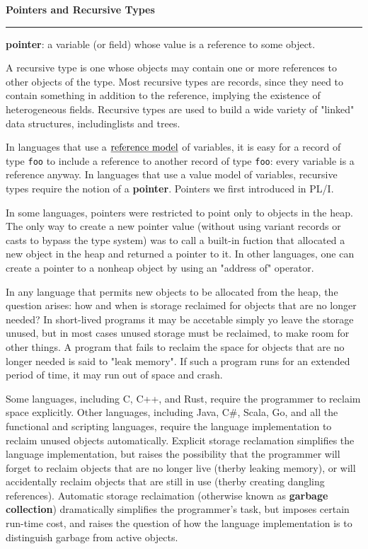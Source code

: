 \nopagenumbers
{\bf Pointers and Recursive Types}
\vskip 1mm
\hrule

\vskip 6pt
{\bf pointer}: a variable (or field) whose value is a reference to some object.

\vskip 6pt
A recursive type is one whose objects may contain one or more references to other objects of the type. Most recursive types are records, since they need to contain something in addition to the reference, implying the existence of heterogeneous fields. Recursive types are used to build a wide variety of "linked" data structures, includinglists and trees.

\vskip 6pt
In languages that use a $\underline{\hbox{reference model}}$ of variables, it is easy for a record of type {\tt foo} to include a reference to another record of type {\tt foo}: every variable is a reference anyway. In languages that use a value model of variables, recursive types require the notion of a {\bf pointer}. Pointers we first introduced in PL/I.

\vskip 6pt
In some languages, pointers were restricted to point only to objects in the heap. The only way to create a new pointer value (without using variant records or casts to bypass the type system) was to call a built-in fuction that allocated a new object in the heap and returned a pointer to it. In other languages, one can create a pointer to a nonheap object by using an "address of" operator.

\vskip 6pt
In any language that permits new objects to be allocated from the heap, the question arises: how and when is storage reclaimed for objects that are no longer needed? In short-lived programs it may be accetable simply yo leave the storage unused, but in most cases unused storage must be reclaimed, to make room for other things. A program that fails to reclaim the space for objects that are no longer needed is said to "leak memory". If such a program runs for an extended period of time, it may run out of space and crash.

\vskip 6pt
Some languages, including C, C++, and Rust, require the programmer to reclaim space explicitly. Other languages, including Java, C$\#$, Scala, Go, and all the functional and scripting languages, require the language implementation to reclaim unused objects automatically. Explicit storage reclamation simplifies the language implementation, but raises the possibility that the programmer will forget to reclaim objects that are no longer live (therby leaking memory), or will accidentally reclaim objects that are still in use (therby creating dangling references). Automatic storage reclaimation (otherwise known as {\bf garbage collection}) dramatically simplifies the programmer's task, but imposes certain run-time cost, and raises the question of how the language implementation is to distinguish garbage from active objects.

\vfill\eject
\bye
